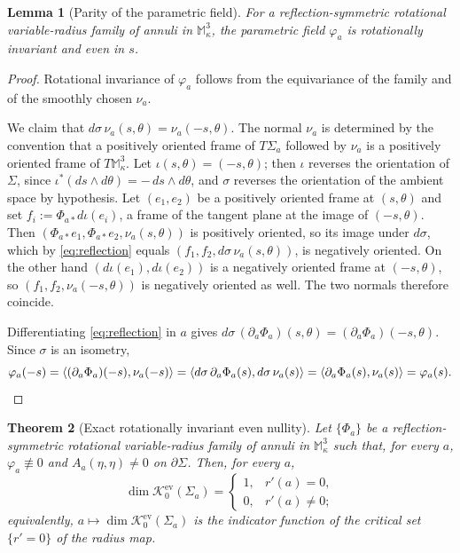 \documentclass[10pt,a4paper]{amsart}
\newtheorem{theorem}{Theorem}[section]
\newtheorem{lemma}[theorem]{Lemma}
\newcommand{\M}{\mathbb{M}}
\newcommand{\Ker}{\mathcal{K}}
\begin{document}
\begin{lemma}[Parity of the parametric field]\label{lem:even}
For a reflection-symmetric rotational variable-radius family of annuli in $\M^3_\kappa$, the parametric field $\varphi_a$ is rotationally invariant and even in $s$.
\end{lemma}

\begin{proof}
Rotational invariance of $\varphi_a$ follows from the equivariance of the family and of the smoothly chosen $\nu_a$.

We claim that $d\sigma\,\nu_a(s,\theta)=\nu_a(-s,\theta)$. The normal $\nu_a$ is determined by the convention that a positively oriented frame of $T\Sigma_a$ followed by $\nu_a$ is a positively oriented frame of $T\M^3_\kappa$. Let $\iota(s,\theta)=(-s,\theta)$; then $\iota$ reverses the orientation of $\Sigma$, since $\iota^*(ds\wedge d\theta)=-\,ds\wedge d\theta$, and $\sigma$ reverses the orientation of the ambient space by hypothesis. Let $(e_1,e_2)$ be a positively oriented frame at $(s,\theta)$ and set $f_i:=\Phi_{a*}d\iota(e_i)$, a frame of the tangent plane at the image of $(-s,\theta)$. Then $(\Phi_{a*}e_1,\Phi_{a*}e_2,\nu_a(s,\theta))$ is positively oriented, so its image under $d\sigma$, which by \eqref{eq:reflection} equals $(f_1,f_2,d\sigma\,\nu_a(s,\theta))$, is negatively oriented. On the other hand $(d\iota(e_1),d\iota(e_2))$ is a negatively oriented frame at $(-s,\theta)$, so $(f_1,f_2,\nu_a(-s,\theta))$ is negatively oriented as well. The two normals therefore coincide.

Differentiating \eqref{eq:reflection} in $a$ gives $d\sigma\,(\partial_a\Phi_a)(s,\theta)=(\partial_a\Phi_a)(-s,\theta)$. Since $\sigma$ is an isometry,
\[
\varphi_a(-s)=\langle(\partial_a\Phi_a)(-s),\nu_a(-s)\rangle=\langle d\sigma\,\partial_a\Phi_a(s),d\sigma\,\nu_a(s)\rangle=\langle\partial_a\Phi_a(s),\nu_a(s)\rangle=\varphi_a(s).\qedhere
\]
\end{proof}


\begin{theorem}[Exact rotationally invariant even nullity]\label{thm:exactnul}
Let $\{\Phi_a\}$ be a reflection-symmetric rotational variable-radius family of annuli in $\M^3_\kappa$ such that, for every $a$, $\varphi_a\not\equiv 0$ and $A_a(\eta,\eta)\neq 0$ on $\partial\Sigma$. Then, for every $a$,
\[
\dim\Ker_0^{\mathrm{ev}}(\Sigma_a)=
\begin{cases}
1,&r'(a)=0,\\
0,&r'(a)\neq 0;
\end{cases}
\]
equivalently, $a\mapsto\dim\Ker_0^{\mathrm{ev}}(\Sigma_a)$ is the indicator function of the critical set $\{r'=0\}$ of the radius map.
\end{theorem}
\end{document}

